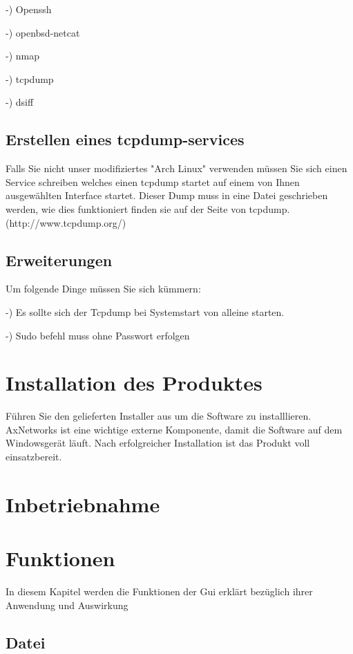 \documentclass[11pt]{article} %
\begin{document}
-) Openssh

-) openbsd-netcat

-) nmap

-) tcpdump

-) dsiff

\subsection{Erstellen eines tcpdump-services}
Falls Sie nicht unser modifiziertes "Arch Linux" verwenden müssen Sie sich einen Service schreiben welches einen tcpdump startet auf einem von Ihnen ausgewählten Interface startet. Dieser Dump muss in eine Datei geschrieben werden, wie dies funktioniert finden sie auf der Seite von tcpdump.(http://www.tcpdump.org/)\\

\subsection{Erweiterungen}

Um folgende Dinge müssen Sie sich kümmern:

-) Es sollte sich der Tcpdump bei Systemstart von alleine starten.

-) Sudo befehl muss ohne Passwort erfolgen

\section{Installation des Produktes}

Führen Sie den gelieferten Installer aus um die Software zu installlieren.\\
AxNetworks ist eine wichtige externe Komponente, damit die Software auf dem Windowsgerät läuft.
Nach erfolgreicher Installation ist das Produkt voll einsatzbereit.\\

\section{Inbetriebnahme}

\pagebreak
\section{Funktionen}
In diesem Kapitel werden die Funktionen der Gui erklärt bezüglich ihrer Anwendung und Auswirkung \\
\subsection{Datei}
\end{document}
